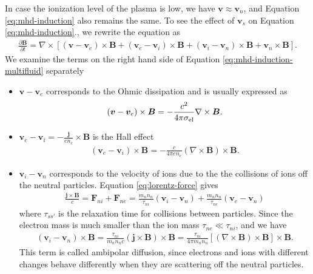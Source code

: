 In case the ionization level of the plasma is low, we have $\boldsymbol{v}\approx \boldsymbol{v}_n$, and Equation \ref{eq:mhd-induction} also remains the same.
To see the effect of $\boldsymbol{v}_s$ on Equation \ref{eq:mhd-induction}., we rewrite the equation as
\begin{eqnarray}\label{eq:mhd-induction-multifluid}
	\frac{\partial \boldsymbol{B}}{\partial t} = \nabla\times\left[(\boldsymbol{v}-\boldsymbol{v}_e)\times \boldsymbol{B} + (\boldsymbol{v}_e-\boldsymbol{v}_i)\times \boldsymbol{B} + (\boldsymbol{v}_i-\boldsymbol{v}_n)\times \boldsymbol{B} + \boldsymbol{v}_n\times\boldsymbol{B}\right].
\end{eqnarray}
We examine the terms on the right hand side of Equation \ref{eq:mhd-induction-multifluid} separately
\begin{itemize}
	\item $\boldsymbol{v}-\boldsymbol{v}_e$ corresponds to the Ohmic dissipation and is usually expressed as 
\begin{eqnarray}
	(\boldsymbol{v}-\boldsymbol{v}_e)\times \boldsymbol{B} = -\frac{c^2}{4\pi\sigma_{\rm el}}\nabla\times \boldsymbol{B}.
\end{eqnarray}
	
	\item $\boldsymbol{v}_e-\boldsymbol{v}_i = -\frac{\boldsymbol{j}}{e n_e}\times \boldsymbol{B} $ is the Hall effect
	\begin{eqnarray}
		(\boldsymbol{v}_e-\boldsymbol{v}_i)\times \boldsymbol{B} = -\frac{c}{4\pi e n_e}(\nabla\times\boldsymbol{B})\times \boldsymbol{B}.
	\end{eqnarray}
	
	\item $\boldsymbol{v}_i-\boldsymbol{v}_n$ corresponds to the velocity of ions due to the the collisions of ions off the neutral particles.
	Equation \ref{eq:lorentz-force} gives
	\begin{eqnarray}
		\frac{\boldsymbol{j}\times\boldsymbol{B}}{c} = \boldsymbol{F}_{ni} + \boldsymbol{F}_{ne} = \frac{m_n n_n}{\tau_{ni}}(\boldsymbol{v}_i-\boldsymbol{v}_n) + \frac{m_n n_n}{\tau_{ne}}(\boldsymbol{v}_e-\boldsymbol{v}_n) 
	\end{eqnarray}
	where $\tau_{ss'}$ is the relaxation time for collisions between particles.
	Since the electron mass is much smaller than the ion mass $\tau_{ne}\ll\tau_{ni}$, and we have 
	\begin{eqnarray}
		(\boldsymbol{v}_i-\boldsymbol{v}_n)\times \boldsymbol{B} = \frac{\tau_{ni}}{m_n n_n c}(\boldsymbol{j}\times\boldsymbol{B})\times\boldsymbol{B} = \frac{\tau_{ni}}{4\pi m_n n_n}\left[(\nabla\times\boldsymbol{B})\times\boldsymbol{B}\right]\times\boldsymbol{B}.
	\end{eqnarray}
	This term is called ambipolar diffusion, since electrons and ions with different changes behave differently when they are scattering off the neutral particles.

\end{itemize}




